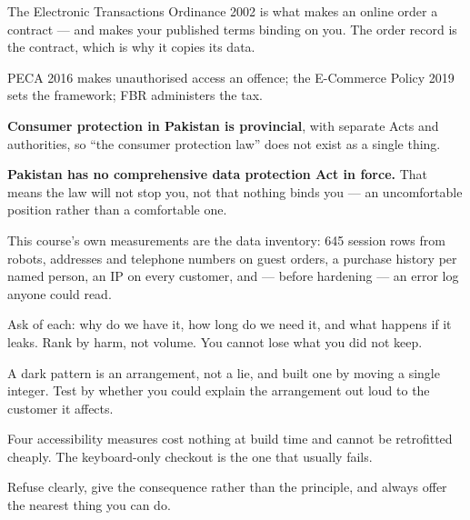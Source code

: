\begin{chaptersummary}
\begin{tight}
  \item The Electronic Transactions Ordinance 2002 is what makes an online
        order a contract --- and makes your published terms binding on you.
        The order record is the contract, which is why it copies its data.
  \item PECA 2016 makes unauthorised access an offence; the E-Commerce Policy
        2019 sets the framework; FBR administers the tax.
  \item \textbf{Consumer protection in Pakistan is provincial}, with separate
        Acts and authorities, so ``the consumer protection law'' does not
        exist as a single thing.
  \item \textbf{Pakistan has no comprehensive data protection Act in force.}
        That means the law will not stop you, not that nothing binds you ---
        an uncomfortable position rather than a comfortable one.
  \item This course's own measurements are the data inventory: 645 session rows
        from robots, addresses and telephone numbers on guest orders, a
        purchase history per named person, an IP on every customer, and ---
        before hardening --- an error log anyone could read.
  \item Ask of each: why do we have it, how long do we need it, and what happens
        if it leaks. Rank by harm, not volume. You cannot lose what you did not
        keep.
  \item A dark pattern is an arrangement, not a lie, and 
        built one by moving a single integer. Test by whether you could explain
        the arrangement out loud to the customer it affects.
  \item Four accessibility measures cost nothing at build time and cannot be
        retrofitted cheaply. The keyboard-only checkout is the one that usually
        fails.
  \item Refuse clearly, give the consequence rather than the principle, and
        always offer the nearest thing you can do.
\end{tight}
\end{chaptersummary}

